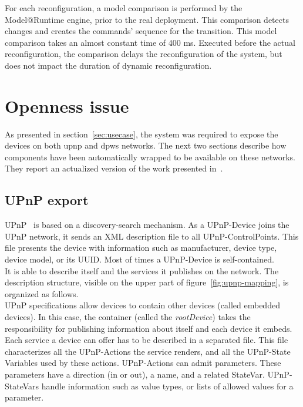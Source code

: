 For each reconfiguration, a model comparison is performed by the Model@Runtime engine, prior to the real deployment. This comparison detects changes and creates the commands' sequence for the transition. This model comparison takes an almost constant time of 400 ms. Executed before the actual reconfiguration, the comparison delays the reconfiguration of the system, but does not impact the duration of dynamic reconfiguration. \\



\section{Openness issue}
\label{subsec:opening}

As presented in section~\ref{sec:usecase}, the system was required to expose the devices on both \gls{upnp} and \gls{dpws} networks. The next two sections describe how components have been automatically wrapped to be available on these networks. They report an actualized version of the work presented in~\cite{Nain08a}.


\subsection{UPnP export}

UPnP~\cite{UPNP} is based on a discovery-search mechanism. As a UPnP-Device joins the UPnP network, it sends an XML description file to all UPnP-ControlPoints. This file presents the device with information such as manufacturer, device type, device model, or its UUID. Most of times a UPnP-Device is self-contained.\\
It is able to describe itself and the services it publishes on the network. The description structure, visible on the upper part of figure~\ref{fig:upnp-mapping}, is organized as follows.\\
UPnP specifications allow devices to contain other devices (called embedded devices). In this case, the container (called the {\it rootDevice}) takes the responsibility for publishing information about itself and each device it embeds.\\
Each service a device can offer has to be described in a separated file. This file characterizes all the UPnP-Actions the service renders, and all the UPnP-State Variables used by these actions. UPnP-Actions can admit parameters. These parameters have a direction (in or out), a name, and a related StateVar. UPnP-StateVars handle information such as value types, or lists of allowed values for a parameter.\\



